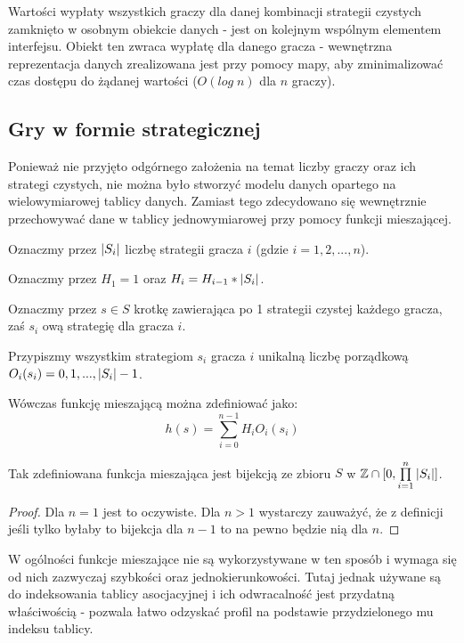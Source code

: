 \documentclass[polish]{standalone}
\begin{document}
Wartości wypłaty wszystkich graczy dla danej kombinacji strategii czystych zamknięto w osobnym obiekcie danych - jest on
kolejnym wspólnym elementem interfejsu. Obiekt ten zwraca wypłatę dla danego gracza - wewnętrzna reprezentacja danych
zrealizowana jest przy pomocy mapy, aby zminimalizować czas dostępu do żądanej wartości ($O(log\;n)$ dla $n$ graczy).

\subsection{Gry w formie strategicznej}

Ponieważ nie przyjęto odgórnego założenia na temat liczby graczy oraz ich strategi czystych, nie można było stworzyć
modelu danych opartego na wielowymiarowej tablicy danych. Zamiast tego zdecydowano się wewnętrznie przechowywać dane
w tablicy jednowymiarowej przy pomocy funkcji mieszającej.

Oznaczmy przez $|S_i|$ liczbę strategii gracza $i$ (gdzie $i = 1, 2, ..., n$).

Oznaczmy przez $H_1 = 1$ oraz $H_i = H_{i-1} * |S_i|$.

Oznaczmy przez $s \in S$ krotkę zawierająca po 1 strategii czystej każdego gracza, zaś $s_i$ ową strategię
dla gracza $i$.

Przypiszmy wszystkim strategiom $s_i$ gracza $i$ unikalną liczbę porządkową $O_i(s_i) = 0, 1, ..., |S_i|-1$.

Wówczas funkcję mieszającą można zdefiniować jako:
$$h(s) = \sum\limits_{i=0}^{n-1} H_i O_i(s_i)$$

\begin{theorem}
Tak zdefiniowana funkcja mieszająca jest bijekcją ze zbioru $S$ w $ \mathbb{Z} \cap [0, \prod\limits_{i=1}^{n} |S_i|] $.
\end{theorem}

\begin{proof}
Dla $n = 1$ jest to oczywiste. Dla $n > 1$ wystarczy zauważyć, że z definicji jeśli tylko byłaby to bijekcja dla $n-1$
to na pewno będzie nią dla $n$.
\end{proof}

W ogólności funkcje mieszające nie są wykorzystywane w ten sposób i wymaga się od nich zazwyczaj szybkości oraz
jednokierunkowości. Tutaj jednak używane są do indeksowania tablicy asocjacyjnej i ich odwracalność jest przydatną
właściwością - pozwala łatwo odzyskać profil na podstawie przydzielonego mu indeksu tablicy.
\end{document}
